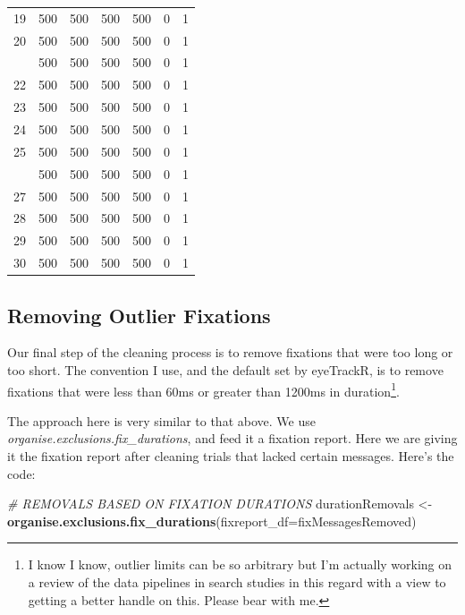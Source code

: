 \documentclass[]{book}
\newenvironment{Shaded}{\begin{snugshade}}{\end{snugshade}}
\newcommand{\CommentTok}[1]{\textcolor[rgb]{0.56,0.35,0.01}{\textit{#1}}}
\newcommand{\DataTypeTok}[1]{\textcolor[rgb]{0.13,0.29,0.53}{#1}}
\newcommand{\KeywordTok}[1]{\textcolor[rgb]{0.13,0.29,0.53}{\textbf{#1}}}
\newcommand{\NormalTok}[1]{#1}
\newcommand{\StringTok}[1]{\textcolor[rgb]{0.31,0.60,0.02}{#1}}
\let\rmarkdownfootnote\footnote%
\def\footnote{\protect\rmarkdownfootnote}
\begin{document}
\begin{table}[t]
\begin{tabular}{rrrrrrr}
19 & 500 & 500 & 500 & 500 & 0 & 1\\
20 & 500 & 500 & 500 & 500 & 0 & 1\\
\addlinespace
21 & 500 & 500 & 500 & 500 & 0 & 1\\
22 & 500 & 500 & 500 & 500 & 0 & 1\\
23 & 500 & 500 & 500 & 500 & 0 & 1\\
24 & 500 & 500 & 500 & 500 & 0 & 1\\
25 & 500 & 500 & 500 & 500 & 0 & 1\\
\addlinespace
26 & 500 & 500 & 500 & 500 & 0 & 1\\
27 & 500 & 500 & 500 & 500 & 0 & 1\\
28 & 500 & 500 & 500 & 500 & 0 & 1\\
29 & 500 & 500 & 500 & 500 & 0 & 1\\
30 & 500 & 500 & 500 & 500 & 0 & 1\\
\bottomrule
\end{tabular}
\end{table}

\hypertarget{removing-outlier-fixations}{%
\subsection{Removing Outlier Fixations}\label{removing-outlier-fixations}}

Our final step of the cleaning process is to remove fixations that were too long or too short. The convention I use, and the default set by eyeTrackR, is to remove fixations that were less than 60ms or greater than 1200ms in duration\footnote{I know I know, outlier limits can be so arbitrary but I'm actually working on a review of the data pipelines in search studies in this regard with a view to getting a better handle on this. Please bear with me.}.

The approach here is very similar to that above. We use \emph{organise.exclusions.fix\_durations}, and feed it a fixation report. Here we are giving it the fixation report after cleaning trials that lacked certain messages. Here's the code:

\begin{Shaded}
\begin{Highlighting}[]
\CommentTok{# REMOVALS BASED ON FIXATION DURATIONS}
\NormalTok{durationRemovals <-}\StringTok{ }\KeywordTok{organise.exclusions.fix_durations}\NormalTok{(}\DataTypeTok{fixreport_df=}\NormalTok{fixMessagesRemoved)}
\end{Highlighting}
\end{Shaded}
\end{document}
